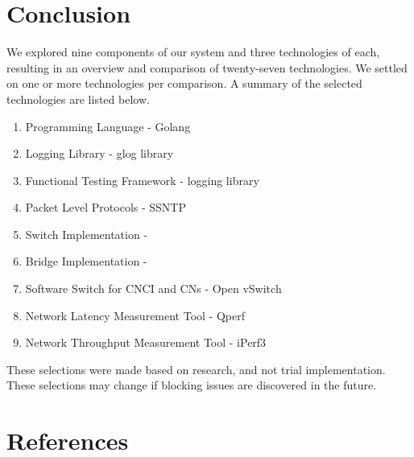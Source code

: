 \documentclass[10pt,letterpaper,onecolumn,draftclsnofoot]{IEEEtran}
\begin{document}
\section{Conclusion}
We explored nine components of our system and three technologies of each,
resulting in an overview and comparison of twenty-seven technologies. We settled
on one or more technologies per comparison. A summary of the selected
technologies are listed below.

\begin{enumerate}
	\item Programming Language - Golang
	\item Logging Library - glog library
	\item Functional Testing Framework - logging library
	\item Packet Level Protocols - SSNTP
	\item Switch Implementation -
	\item Bridge Implementation -
	\item Software Switch for CNCI and CNs - Open vSwitch
	\item Network Latency Measurement Tool - Qperf
	\item Network Throughput Measurement Tool - iPerf3
\end{enumerate}

These selections were made based on research, and not trial implementation.
These selections may change if blocking issues are discovered in the future.
\section{References}



\end{document}
